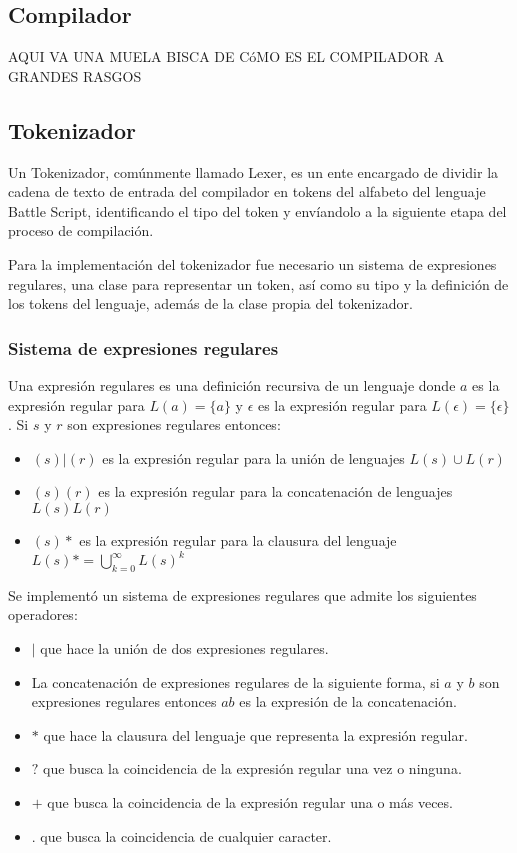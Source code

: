 \subsection{Compilador}

AQUI VA UNA MUELA BISCA DE CóMO ES EL COMPILADOR A GRANDES RASGOS

\subsection{Tokenizador}

Un Tokenizador, comúnmente llamado Lexer, es un ente encargado de dividir la cadena de texto de entrada del compilador en tokens del alfabeto del lenguaje Battle Script, identificando el tipo del token y envíandolo a la siguiente etapa del proceso de compilación.

Para la implementación del tokenizador fue necesario un sistema de expresiones regulares, una clase para representar un token, así como su tipo y la definición de los tokens del lenguaje, además de la clase propia del tokenizador. 

\subsubsection{Sistema de expresiones regulares}

Una expresión regulares es una definición recursiva de un lenguaje donde $a$ es la expresión regular para $L(a) = \{a\}$ y $\epsilon$ es la expresión regular para $L(\epsilon) = \{\epsilon\}$. Si $s$ y $r$ son expresiones regulares entonces:

\begin{itemize}
    \item $(s)|(r)$ es la expresión regular para la unión de lenguajes $L(s) \cup L(r)$
    \item $(s)(r)$ es la expresión regular para la concatenación de lenguajes $L(s)L(r)$
    \item $(s)*$ es la expresión regular para la clausura del lenguaje $L(s)* = \bigcup\limits_{k=0}^{\infty} L(s)^k$
\end{itemize}

Se implementó un sistema de expresiones regulares que admite los siguientes operadores:

\begin{itemize}
    \item $|$ que hace la unión de dos expresiones regulares.
    \item La concatenación de expresiones regulares de la siguiente forma, si $a$ y $b$ son expresiones regulares entonces $ab$ es la expresión de la concatenación.
    \item $*$ que hace la clausura del lenguaje que representa la expresión regular.
    \item $?$ que busca la coincidencia de la expresión regular una vez o ninguna.
    \item $+$ que busca la coincidencia de la expresión regular una o más veces.
    \item $.$ que busca la coincidencia de cualquier caracter.
\end{itemize}

